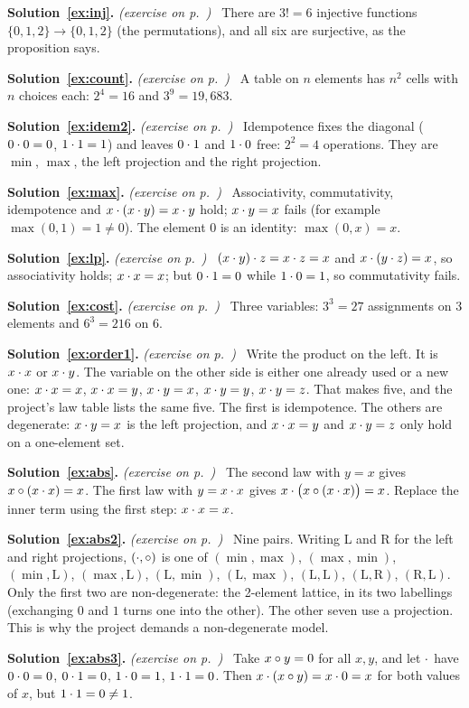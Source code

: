 \documentclass[11pt,a4paper]{article}
\newcommand{\solution}[1]{\par\medskip\noindent\textbf{Solution~\ref{ex:#1}.}\label{sol:#1}
  \textit{(exercise on p.~\pageref{ex:#1})}\ }
\begin{document}
\solution{inj}
There are $3!=6$ injective functions $\{0,1,2\}\to\{0,1,2\}$ (the permutations), and all six are surjective, as the
proposition says.

\solution{count}
A table on $n$ elements has $n^2$ cells with $n$ choices each: $2^4=16$ and $3^9=19{,}683$.

\solution{idem2}
Idempotence fixes the diagonal ($0\cdot0=0$, $1\cdot1=1$) and leaves $0\cdot1$ and $1\cdot0$ free: $2^2=4$ operations. They
are $\min$, $\max$, the left projection and the right projection.

\solution{max}
Associativity, commutativity, idempotence and $x\cdot(x\cdot y)=x\cdot y$ hold; $x\cdot y=x$ fails (for example
$\max(0,1)=1\neq0$). The element $0$ is an identity: $\max(0,x)=x$.

\solution{lp}
$(x\cdot y)\cdot z=x\cdot z=x$ and $x\cdot(y\cdot z)=x$, so associativity holds; $x\cdot x=x$; but $0\cdot1=0$ while $1\cdot0=1$, so
commutativity fails.

\solution{cost}
Three variables: $3^3=27$ assignments on 3 elements and $6^3=216$ on 6.

\solution{order1}
Write the product on the left. It is $x\cdot x$ or $x\cdot y$. The variable on the other side is either one already used or
a new one: $x\cdot x=x$, $x\cdot x=y$, $x\cdot y=x$, $x\cdot y=y$, $x\cdot y=z$. That makes five, and the project's law table
lists the same five. The first is idempotence. The others are degenerate: $x\cdot y=x$ is the left projection, and
$x\cdot x=y$ and $x\cdot y=z$ only hold on a one-element set.

\solution{abs}
The second law with $y=x$ gives $x\circ(x\cdot x)=x$. The first law with $y=x\cdot x$ gives $x\cdot\bigl(x\circ(x\cdot x)\bigr)=x$.
Replace the inner term using the first step: $x\cdot x=x$.

\solution{abs2}
Nine pairs. Writing L and R for the left and right projections, $(\cdot,\circ)$ is one of $(\min,\max)$, $(\max,\min)$,
$(\min,\mathrm{L})$, $(\max,\mathrm{L})$, $(\mathrm{L},\min)$, $(\mathrm{L},\max)$, $(\mathrm{L},\mathrm{L})$,
$(\mathrm{L},\mathrm{R})$, $(\mathrm{R},\mathrm{L})$. Only the first two are non-degenerate: the 2-element lattice, in
its two labellings (exchanging $0$ and $1$ turns one into the other). The other seven use a projection. This is why the project demands a non-degenerate model.

\solution{abs3}
Take $x\circ y=0$ for all $x,y$, and let $\cdot$ have $0\cdot0=0$, $0\cdot1=0$, $1\cdot0=1$, $1\cdot1=0$. Then $x\cdot(x\circ y)=x\cdot0=x$
for both values of $x$, but $1\cdot1=0\neq1$.
\end{document}
